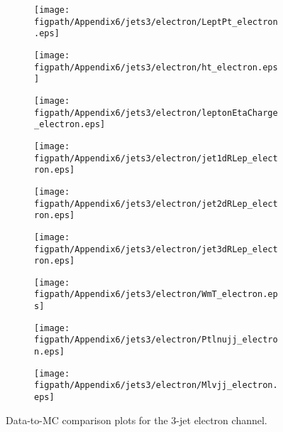 \begin{figure}[!hbtp]
    \centering
    \begin{subfigure}[t]{0.317\textwidth}
        \texttt{[image: \\figpath/Appendix6/jets3/electron/LeptPt\_electron.eps]}
    \end{subfigure}
    \begin{subfigure}[t]{0.317\textwidth}
        \texttt{[image: \\figpath/Appendix6/jets3/electron/ht\_electron.eps]}
    \end{subfigure}
    \begin{subfigure}[t]{0.317\textwidth}
        \texttt{[image: \\figpath/Appendix6/jets3/electron/leptonEtaCharge\_electron.eps]}
    \end{subfigure}

    \begin{subfigure}[t]{0.317\textwidth}
        \texttt{[image: \\figpath/Appendix6/jets3/electron/jet1dRLep\_electron.eps]}
    \end{subfigure}
    \begin{subfigure}[t]{0.317\textwidth}
        \texttt{[image: \\figpath/Appendix6/jets3/electron/jet2dRLep\_electron.eps]}
    \end{subfigure}
    \begin{subfigure}[t]{0.317\textwidth}
        \texttt{[image: \\figpath/Appendix6/jets3/electron/jet3dRLep\_electron.eps]}
    \end{subfigure}

    \begin{subfigure}[t]{0.317\textwidth}
        \texttt{[image: \\figpath/Appendix6/jets3/electron/WmT\_electron.eps]}
    \end{subfigure}
    \begin{subfigure}[t]{0.317\textwidth}
        \texttt{[image: \\figpath/Appendix6/jets3/electron/Ptlnujj\_electron.eps]}
    \end{subfigure}
    \begin{subfigure}[t]{0.317\textwidth}
        \texttt{[image: \\figpath/Appendix6/jets3/electron/Mlvjj\_electron.eps]}
    \end{subfigure}
    \caption{Data-to-MC comparison plots for the 3-jet electron channel.}
    \label{fig:comparison_plots_jets3_electron_2}
\end{figure}















